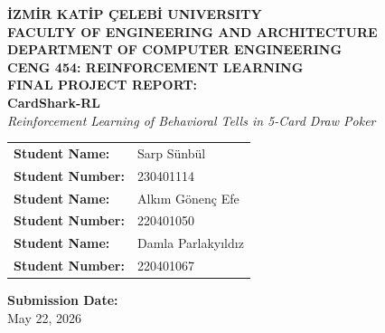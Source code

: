 \documentclass[11pt, conference]{IEEEtran}
\begin{document}
\begin{titlepage}
    \singlespacing
    \centering
    \vspace*{1cm}
    
    {\Large \textbf{İZMİR KATİP ÇELEBİ UNIVERSITY}} \\[0.5cm]
    {\large \textbf{FACULTY OF ENGINEERING AND ARCHITECTURE}} \\[0.5cm]
    {\large \textbf{DEPARTMENT OF COMPUTER ENGINEERING}} \\[3cm]
    
    {\large \textbf{CENG 454: REINFORCEMENT LEARNING}} \\[2cm]
    
    {\LARGE \textbf{FINAL PROJECT REPORT:}} \\[0.5cm]
    {\huge \textbf{CardShark-RL}} \\[0.3cm]
    {\large \textit{Reinforcement Learning of Behavioral Tells in 5-Card Draw Poker}} \\[4cm]
    
    \begin{table}[h]
        \centering
        \begin{tabular}{ll}
            \textbf{Student Name:} & Sarp S\"unb\"ul \\
            \textbf{Student Number:} & 230401114 \\
            \addlinespace
            \textbf{Student Name:} & Alk\i m G\"onen\c{c} Efe \\
            \textbf{Student Number:} & 220401050 \\
            \addlinespace
            \textbf{Student Name:} & Damla Parlaky\i ld\i z \\
            \textbf{Student Number:} & 220401067 \\
        \end{tabular}
    \end{table}
    
    \vfill
    {\large \textbf{Submission Date:}} \\[0.2cm]
    {\large May 22, 2026}
    \vspace*{1cm}
\end{titlepage}

\clearpage
{} 

\end{document}
